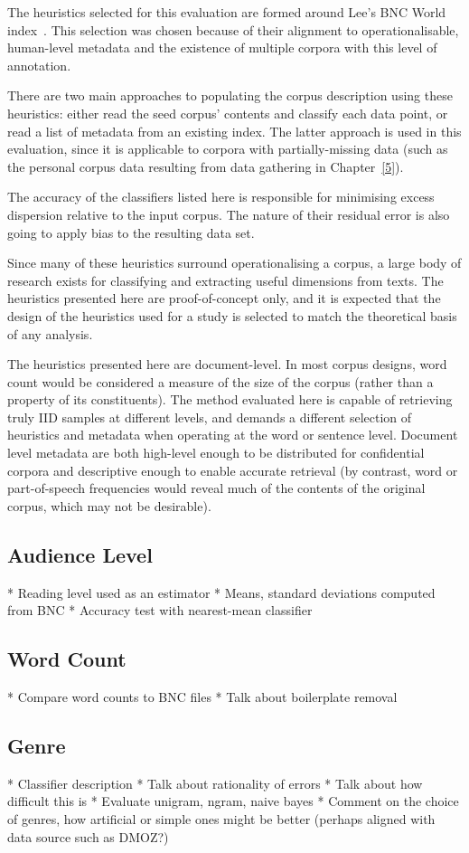 The heuristics selected for this evaluation are formed around Lee's BNC World index~\cite{lee2001genres}.  This selection was chosen because of their alignment to operationalisable, human-level metadata and the existence of multiple corpora with this level of annotation.



There are two main approaches to populating the corpus description using these heuristics: either read the seed corpus' contents and classify each data point, or read a list of metadata from an existing index.  The latter approach is used in this evaluation, since it is applicable to corpora with partially-missing data (such as the personal corpus data resulting from data gathering in Chapter~\ref{5}).

The accuracy of the classifiers listed here is responsible for minimising excess dispersion relative to the input corpus.  The nature of their residual error is also going to apply bias to the resulting data set.

Since many of these heuristics surround operationalising a corpus, a large body of research exists for classifying and extracting useful dimensions from texts.  The heuristics presented here are proof-of-concept only, and it is expected that the design of the heuristics used for a study is selected to match the theoretical basis of any analysis.

The heuristics presented here are document-level.  In most corpus designs, word count would be considered a measure of the size of the corpus (rather than a property of its constituents).  The method evaluated here is capable of retrieving truly IID samples at different levels, and demands a different selection of heuristics and metadata when operating at the word or sentence level.  Document level metadata are both high-level enough to be distributed for confidential corpora and descriptive enough to enable accurate retrieval (by contrast, word or part-of-speech frequencies would reveal much of the contents of the original corpus, which may not be desirable).

\subsection{Audience Level}
* Reading level used as an estimator
* Means, standard deviations computed from BNC
* Accuracy test with nearest-mean classifier

\subsection{Word Count}
* Compare word counts to BNC files
* Talk about boilerplate removal

\subsection{Genre}
* Classifier description
* Talk about rationality of errors
* Talk about how difficult this is
* Evaluate unigram, ngram, naive bayes
* Comment on the choice of genres, how artificial or simple ones might be better (perhaps aligned with data source such as DMOZ?)


